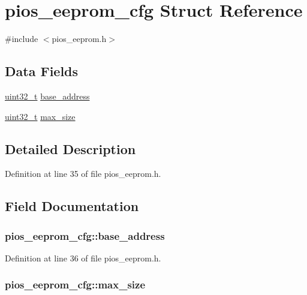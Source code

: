 \hypertarget{structpios__eeprom__cfg}{\section{pios\-\_\-eeprom\-\_\-cfg Struct Reference}
\label{structpios__eeprom__cfg}
}


{\ttfamily \#include $<$pios\-\_\-eeprom.\-h$>$}

\subsection*{Data Fields}
\begin{DoxyCompactItemize}
\item 
\hyperlink{stdint_8h_a435d1572bf3f880d55459d9805097f62}{uint32\-\_\-t} \hyperlink{structpios__eeprom__cfg_a18fb5ba0b30fbb8656ce2198aae2bdfa}{base\-\_\-address}
\item 
\hyperlink{stdint_8h_a435d1572bf3f880d55459d9805097f62}{uint32\-\_\-t} \hyperlink{structpios__eeprom__cfg_a86c7bcba53acd76ef56bac1dd0e2fe95}{max\-\_\-size}
\end{DoxyCompactItemize}


\subsection{Detailed Description}


Definition at line 35 of file pios\-\_\-eeprom.\-h.



\subsection{Field Documentation}
\hypertarget{structpios__eeprom__cfg_a18fb5ba0b30fbb8656ce2198aae2bdfa}{
\subsubsection[{base\-\_\-address}]{ pios\-\_\-eeprom\-\_\-cfg\-::base\-\_\-address}}\label{structpios__eeprom__cfg_a18fb5ba0b30fbb8656ce2198aae2bdfa}


Definition at line 36 of file pios\-\_\-eeprom.\-h.

\hypertarget{structpios__eeprom__cfg_a86c7bcba53acd76ef56bac1dd0e2fe95}{
\subsubsection[{max\-\_\-size}]{ pios\-\_\-eeprom\-\_\-cfg\-::max\-\_\-size}}\label{structpios__eeprom__cfg_a86c7bcba53acd76ef56bac1dd0e2fe95}


